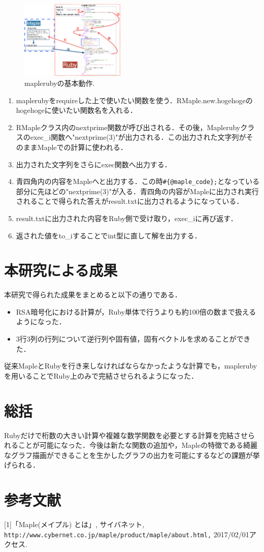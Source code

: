 \documentclass[10pt,a4j,twocolumn]{jsarticle}
\begin{document}
\begin{figure}[htbp]\begin{center}
\includegraphics[width=5cm,bb=0 0 546 408]{./mapleruby_003.png}
\caption{maplerubyの基本動作.}
\label{default}\end{center}\end{figure}
\begin{enumerate}
\item maplerubyをrequireした上で使いたい関数を使う．RMaple.new.hogehogeのhogehogeに使いたい関数名を入れる．
\item RMapleクラス内のnextprime関数が呼び出される．その後，Maplerubyクラスのexec\_i関数へ"nextprime(3)"が出力される．この出力された文字列がそのままMapleでの計算に使われる．
\item 出力された文字列をさらにexec関数へ出力する．
\item 青四角内の内容をMapleへと出力する．この時\verb|#{@maple_code};|となっている部分に先ほどの"nextprime(3)"が入る．青四角の内容がMapleに出力され実行されることで得られた答えがresult.txtに出力されるようになっている．
\item result.txtに出力された内容をRuby側で受け取り，exec\_iに再び返す．
\item 返された値をto\_iすることでint型に直して解を出力する．
\end{enumerate}
\section{本研究による成果}
本研究で得られた成果をまとめると以下の通りである．

\begin{itemize}
\item RSA暗号化における計算が，Ruby単体で行うよりも約100倍の数まで扱えるようになった．
\item 3行3列の行列について逆行列や固有値，固有ベクトルを求めることができた．
\end{itemize}
従来MapleとRubyを行き来しなければならなかったような計算でも，maplerubyを用いることでRuby上のみで完結させられるようになった．

\section{総括}
Rubyだけで桁数の大きい計算や複雑な数学関数を必要とする計算を完結させられることが可能になった．今後は新たな関数の追加や，Mapleの特徴である綺麗なグラフ描画ができることを生かしたグラフの出力を可能にするなどの課題が挙げられる．

\section{参考文献}
[1]「Maple(メイプル) とは」, サイバネット, \verb|http://www.cybernet.co.jp/maple/product/maple/about.html,| 2017/02/01アクセス.
\end{document}
